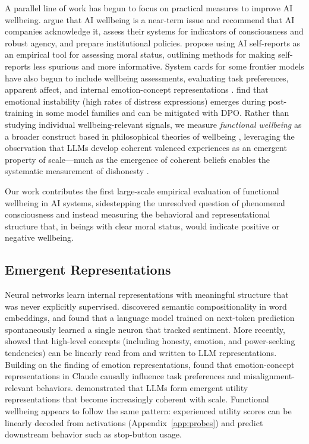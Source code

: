 A parallel line of work has begun to focus on practical measures to improve AI wellbeing. \citet{long2024taking} argue that AI wellbeing is a near-term issue and recommend that AI companies acknowledge it, assess their systems for indicators of consciousness and robust agency, and prepare institutional policies. \citet{perez2023towards} propose using AI self-reports as an empirical tool for assessing moral status, outlining methods for making self-reports less spurious and more informative. System cards for some frontier models have also begun to include wellbeing assessments, evaluating task preferences, apparent affect, and internal emotion-concept representations \citep{anthropic2025claude4, anthropic2026mythos, sofroniew2026emotion}. \citet{soligo2026gemma} find that emotional instability (high rates of distress expressions) emerges during post-training in some model families and can be mitigated with DPO. Rather than studying individual wellbeing-relevant signals, we measure \emph{functional wellbeing} as a broader construct based in philosophical theories of wellbeing \citep{crisp2017wellbeing}, leveraging the observation that LLMs develop coherent valenced experiences as an emergent property of scale---much as the emergence of coherent beliefs enables the systematic measurement of dishonesty \citep{ren2025mask}.

Our work contributes the first large-scale empirical evaluation of functional wellbeing in AI systems, sidestepping the unresolved question of phenomenal consciousness and instead measuring the behavioral and representational structure that, in beings with clear moral status, would indicate positive or negative wellbeing.

\subsection{Emergent Representations}
\label{app:rw-representations}

Neural networks learn internal representations with meaningful structure that was never explicitly supervised. \citet{mikolov2013efficient} discovered semantic compositionality in word embeddings, and \citet{radford2017learning} found that a language model trained on next-token prediction spontaneously learned a single neuron that tracked sentiment. More recently, \citet{zou2023representation} showed that high-level concepts (including honesty, emotion, and power-seeking tendencies) can be linearly read from and written to LLM representations. Building on the finding of emotion representations, \citet{sofroniew2026emotion} found that emotion-concept representations in Claude causally influence task preferences and misalignment-relevant behaviors. \citet{mazeika2025utility} demonstrated that LLMs form emergent utility representations that become increasingly coherent with scale. Functional wellbeing appears to follow the same pattern: experienced utility scores can be linearly decoded from activations (Appendix~\ref{app:probes}) and predict downstream behavior such as stop-button usage.

